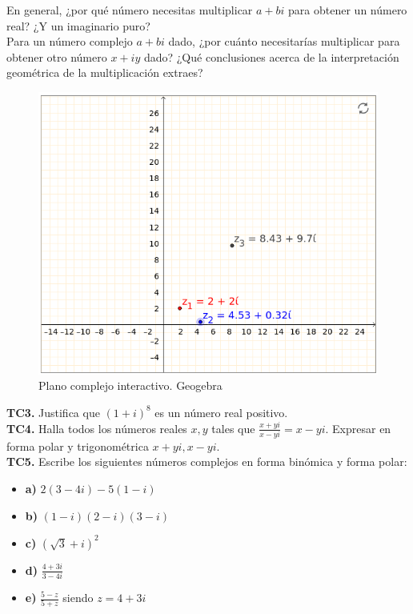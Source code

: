 \documentclass[../main.tex]{memoir}
\begin{document}
En general, ¿por qué número necesitas multiplicar $a+bi$ para obtener un número real? ¿Y un imaginario puro? \\

Para un número complejo $a+bi$ dado, ¿por cuánto necesitarías multiplicar para obtener otro número $x+iy$ dado? ¿Qué conclusiones acerca de la interpretación geométrica de la multiplicación extraes? \\

\begin{figure}[H]
	\centering
	\includegraphics[scale=0.3]{images/geogebra-interactivo.png}
	\caption{Plano complejo interactivo. Geogebra}
	\label{geogebra-interact}
\end{figure}

\textbf{TC3.} Justifica que $(1+i)^8$ es un número real positivo. \\

\textbf{TC4.} Halla todos los números reales $x,y$ tales que $\frac{x+yi}{x-yi}=x-yi$. Expresar en forma polar y trigonométrica $x+yi, x-yi$. \\


\textbf{TC5.} Escribe los siguientes números complejos en forma binómica y forma polar:

\begin{itemize}
	\item \textbf{a)} $2(3-4i)-5(1-i)$
	\item \textbf{b)} $(1-i)(2-i)(3-i)$
	\item \textbf{c)} $(\sqrt{3}+i)^2$
	\item \textbf{d)} $\displaystyle \frac{4+3i}{3-4i}$
	\item \textbf{e)} $\displaystyle \frac{5-z}{5+z}$ siendo $z=4+3i$
\end{itemize}
\end{document}
